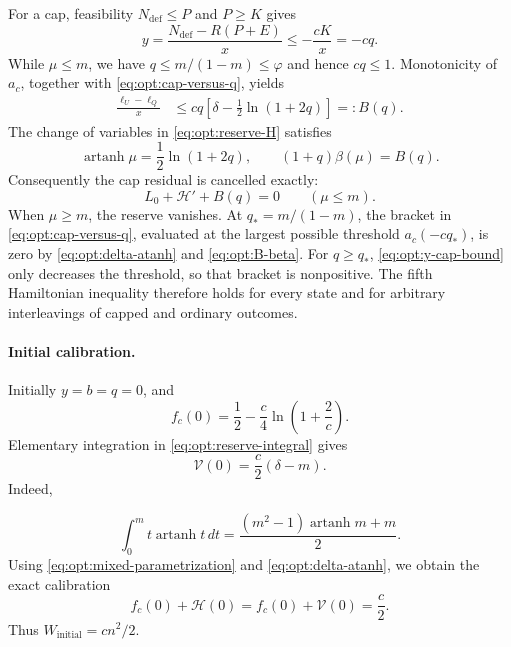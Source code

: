 For a cap, feasibility $N_{\mathrm{def}}\le P$ and $P\ge K$ gives
\begin{equation}
 y=\frac{N_{\mathrm{def}}-R(P+E)}x\le-\frac{cK}{x}=-cq.
 \label{eq:opt:y-cap-bound}
\end{equation}
While $\mu\le m$, we have $q\le m/(1-m)\le\varphi$ and hence
$cq\le1$.  Monotonicity of $a_c$, together with
\eqref{eq:opt:cap-versus-q}, yields
\begin{align}
 \frac{\ell_U-\ell_Q}{x}
 &\le cq\left[\delta-\frac12\ln(1+2q)\right]
 =:B(q).
 \label{eq:opt:cap-residual-B}
\end{align}
The change of variables in \eqref{eq:opt:reserve-H} satisfies
\begin{equation}
 \operatorname{artanh}\mu=\frac12\ln(1+2q),
 \qquad
 (1+q)\beta(\mu)=B(q).
 \label{eq:opt:B-beta}
\end{equation}
Consequently the cap residual is cancelled exactly:
\begin{equation}
 L_0+\mathcal H'+B(q)=0
 \qquad(\mu\le m).
 \label{eq:opt:reserve-cancellation}
\end{equation}
When $\mu\ge m$, the reserve vanishes.  At
$q_*=m/(1-m)$, the bracket in
\eqref{eq:opt:cap-versus-q}, evaluated at the largest possible threshold
$a_c(-cq_*)$, is zero by
\eqref{eq:opt:delta-atanh} and \eqref{eq:opt:B-beta}.  For $q\ge q_*$,
\eqref{eq:opt:y-cap-bound} only decreases the threshold, so that bracket is
nonpositive.  The fifth Hamiltonian inequality therefore holds for every
state and for arbitrary interleavings of capped and ordinary outcomes.

\paragraph{Initial calibration.}
Initially $y=b=q=0$, and
\begin{equation}
 f_c(0)=\frac12-\frac c4\ln\!\left(1+\frac2c\right).
 \label{eq:opt:f-zero}
\end{equation}
Elementary integration in \eqref{eq:opt:reserve-integral} gives
\begin{equation}
 \mathcal V(0)=\frac c2(\delta-m).
 \label{eq:opt:V-zero}
\end{equation}
Indeed,

\[
 \int_0^m t\operatorname{artanh}t\,dt
 =\frac{(m^2-1)\operatorname{artanh}m+m}{2}.
\]
Using \eqref{eq:opt:mixed-parametrization} and
\eqref{eq:opt:delta-atanh}, we obtain the exact calibration
\begin{equation}
 f_c(0)+\mathcal H(0)
 =f_c(0)+\mathcal V(0)=\frac c2.
 \label{eq:opt:initial-calibration}
\end{equation}
Thus $W_{\mathrm{initial}}=cn^2/2$.

